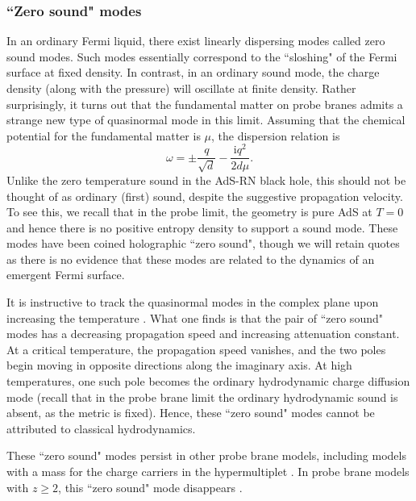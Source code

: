 \documentclass[10pt, oneside]{book}
\begin{document}
\begin{doublespace}
\subsubsection{``Zero sound" modes}
In an ordinary Fermi liquid, there exist linearly dispersing modes called zero sound modes.   Such modes essentially correspond to the ``sloshing" of the Fermi surface at fixed density.   In contrast, in an ordinary sound mode, the charge density (along with the pressure) will oscillate at finite density.  Rather surprisingly, it turns out that the fundamental matter on probe branes admits a strange new type of quasinormal mode in this limit.   Assuming that the chemical potential for the fundamental matter is $\mu$, the dispersion relation is
\cite{Karch:2008fa}
\begin{equation}
\omega = \pm \frac{q}{\sqrt{d}} - \frac{\mathrm{i}q^2}{2d\mu}.
\end{equation}
Unlike the zero temperature sound in the AdS-RN black hole, this should not be thought of as ordinary (first) sound, despite the suggestive propagation velocity.   To see this, we recall that in the probe limit, the geometry is pure AdS at $T=0$ and hence there is no positive entropy density to support a sound mode.  These modes have been coined holographic ``zero sound",  though we will retain quotes as there is no evidence that these modes are related to the dynamics of an emergent Fermi surface. 

It is instructive to track the quasinormal modes in the complex plane upon increasing the temperature \cite{Davison:2011ek}.   What one finds is that the pair of ``zero sound" modes has a decreasing propagation speed and increasing attenuation constant.  At a critical temperature, the propagation speed vanishes, and the two poles begin moving in opposite directions along the imaginary axis.   At high temperatures, one such pole becomes the ordinary hydrodynamic charge diffusion mode (recall that in the probe brane limit the ordinary hydrodynamic sound is absent, as the metric is fixed).    Hence, these ``zero sound" modes cannot be attributed to classical hydrodynamics.

These ``zero sound" modes persist in other probe brane models, including models with a mass for the charge carriers in the hypermultiplet \cite{Kulaxizi:2008kv}.   In probe brane models with $z\ge 2$, this ``zero sound" mode disappears \cite{HoyosBadajoz:2010kd}.


\end{doublespace}
\end{document}
